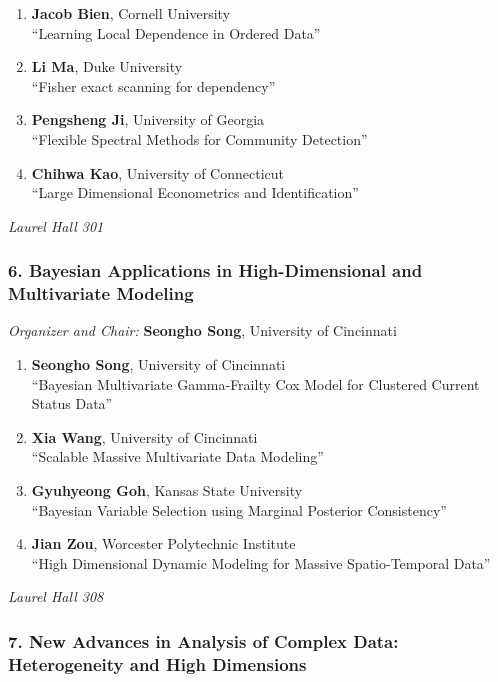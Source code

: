 \begin{enumerate}
\item \textbf{Jacob Bien}, Cornell University \\
``Learning Local Dependence in Ordered Data''
\item \textbf{Li Ma}, Duke University \\
``Fisher exact scanning for dependency''
\item \textbf{Pengsheng Ji}, University of Georgia \\
``Flexible Spectral Methods for Community Detection''
\item \textbf{Chihwa Kao}, University of Connecticut \\
``Large Dimensional Econometrics and Identification''
\end{enumerate}

\emph{Laurel Hall 301} \\[.5em]

\subsubsection*{6. Bayesian Applications in High-Dimensional and Multivariate Modeling}

\emph{Organizer and Chair:} \textbf{Seongho Song}, University of Cincinnati

\begin{enumerate}
\item \textbf{Seongho Song}, University of Cincinnati \\
``Bayesian Multivariate Gamma-Frailty Cox Model for Clustered Current Status Data''
\item \textbf{Xia Wang}, University of Cincinnati \\
``Scalable Massive Multivariate Data Modeling''
\item \textbf{Gyuhyeong Goh}, Kansas State University \\
``Bayesian Variable Selection using Marginal Posterior Consistency''
\item \textbf{Jian Zou}, Worcester Polytechnic Institute \\
``High Dimensional Dynamic Modeling for Massive Spatio-Temporal Data''
\end{enumerate}

\emph{Laurel Hall 308} \\[.5em]

\subsubsection*{7. New Advances in Analysis of Complex Data: Heterogeneity and High Dimensions}

